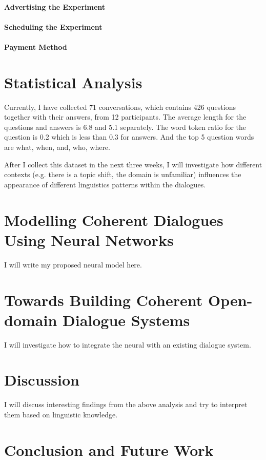 \documentclass[bsc,frontabs,twoside,singlespacing,parskip,deptreport]{infthesis}     %
\begin{document}
\subsubsection*{Advertising the Experiment}
\subsubsection*{Scheduling the Experiment}
\subsubsection*{Payment Method}

\chapter{Statistical Analysis}

Currently, I have collected 71 conversations, which contains 426 questions together with their answers, from 12 participants. The average length for the questions and answers is 6.8 and 5.1 separately. The word token ratio for the question is 0.2 which is less than 0.3 for answers. And the top 5 question words are what, when, and, who, where.

After I collect this dataset in the next three weeks, I will investigate how different contexts (e.g. there is a topic shift, the domain is unfamiliar) influences the appearance of different linguistics patterns within the dialogues.

\chapter{Modelling Coherent Dialogues Using Neural Networks}
I will write my proposed neural model here.

\chapter{Towards Building Coherent Open-domain Dialogue Systems}
I will investigate how to integrate the neural with an existing dialogue system. 

\chapter{Discussion}
I will discuss interesting findings from the above analysis and try to interpret them based on linguistic knowledge. 

\chapter{Conclusion and Future Work}



\end{document}
